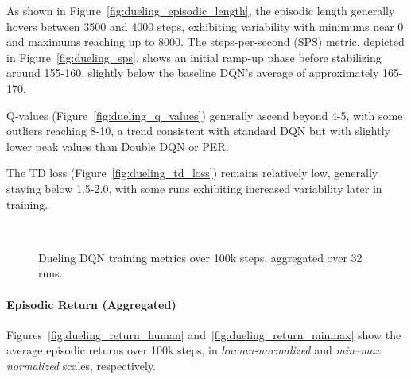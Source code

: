 As shown in Figure~\ref{fig:dueling_episodic_length}, the episodic length generally hovers between 3500 and 4000 steps, exhibiting variability with minimums near 0 and maximums reaching up to 8000. The steps-per-second (SPS) metric, depicted in Figure~\ref{fig:dueling_sps}, shows an initial ramp-up phase before stabilizing around 155-160, slightly below the baseline DQN's average of approximately 165-170.

Q-values (Figure~\ref{fig:dueling_q_values}) generally ascend beyond 4-5, with some outliers reaching 8-10, a trend consistent with standard DQN but with slightly lower peak values than Double DQN or PER. 

The TD loss (Figure~\ref{fig:dueling_td_loss}) remains relatively low, generally staying below 1.5-2.0, with some runs exhibiting increased variability later in training. 

\begin{figure}
	\centering
	\quad
	\\[1em]
	\quad
	\caption{Dueling DQN training metrics over 100k steps, aggregated over 32 runs.}
	\label{fig:dueling_training_metrics}
\end{figure}

\paragraph{Episodic Return (Aggregated)}
Figures~\ref{fig:dueling_return_human} and~\ref{fig:dueling_return_minmax} show 
the average episodic returns over 100k steps, in \emph{human-normalized} and 
\emph{min--max normalized} scales, respectively. 

